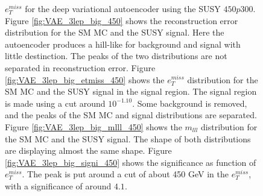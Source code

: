 \begin{figure}[H]
{    $e_T^{miss}$ for the deep variational autoencoder using the SUSY $450p300$.
    Figure \ref{fig:VAE_3lep_big_450} shows the reconstruction error 
    distribution for the SM MC and the SUSY signal. Here the autoencoder produces a hill-like for background and 
    signal with little destinction. The peaks of the two distributions are not separated in reconstruction error. Figure \ref{fig:VAE_3lep_big_etmiss_450} 
    shows the $e_T^{miss}$ distribution for the SM MC and the SUSY signal in the signal region. 
    The signal region is made using a cut around $10^{-1.10}$. Some background is removed, and the peaks of the SM MC and signal 
    distributions are separated. Figure \ref{fig:VAE_3lep_big_mlll_450} shows the $m_{lll}$ distribution for the SM MC and the SUSY signal. 
    The shape of both distributions are displaying almost the same shape. Figure \ref{fig:VAE_3lep_big_signi_450} shows the significance as 
    function of $e_T^{miss}$. The peak is put around a cut of about 450 GeV in the $e_T^{miss}$, with a significance of around $4.1$.}
    \label{fig:VAE_3lep_big_rec_sig_signi_450}
\end{figure}

